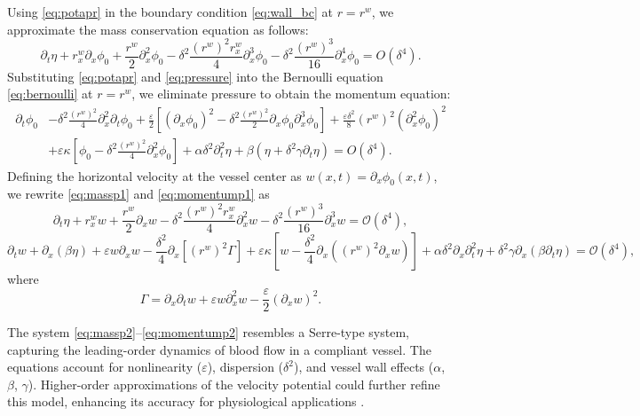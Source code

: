 \documentclass[alpha-refs, 12pt]{wiley-article}
\renewcommand{\O}{\mathcal{O}}
\newcommand{\eps}{\varepsilon}
\begin{document}
Using \eqref{eq:potapr} in the boundary condition \eqref{eq:wall_bc} at $r = r^w$, we approximate the mass conservation equation as follows:
\begin{equation}\label{eq:massp1}
  \partial_t \eta + r^w_x \partial_x \phi_0 + \frac{r^w}{2} \partial_x^2 \phi_0 - \delta^2 \frac{(r^w)^2 r^w_x}{4} \partial_x^3 \phi_0 - \delta^2 \frac{(r^w)^3}{16} \partial_x^4 \phi_0 = O(\delta^4).
\end{equation}
Substituting \eqref{eq:potapr} and \eqref{eq:pressure} into the Bernoulli equation \eqref{eq:bernoulli} at $r = r^w$, we eliminate pressure to obtain the momentum equation:
\begin{equation}\label{eq:momentump1}
\begin{split}
\partial_t \phi_0 & - \delta^2 \frac{(r^w)^2}{4} \partial_x^2 \partial_t \phi_0 + \frac{\eps}{2} \left[ (\partial_x \phi_0)^2 - \delta^2 \frac{(r^w)^2}{2} \partial_x \phi_0 \partial_x^3 \phi_0 \right] + \frac{\eps \delta^2}{8} (r^w)^2 (\partial_x^2 \phi_0)^2 \\
& + \eps \kappa \left[ \phi_0 - \delta^2 \frac{(r^w)^2}{4} \partial_x^2 \phi_0 \right] + \alpha \delta^2 \partial_t^2 \eta + \beta (\eta + \delta^2 \gamma \partial_t \eta) = O(\delta^4).
\end{split}
\end{equation}
Defining the horizontal velocity at the vessel center as $w(x, t) = \partial_x \phi_0(x, t)$, we rewrite \eqref{eq:massp1} and \eqref{eq:momentump1} as
\begin{equation}\label{eq:massp2}
  \partial_t \eta + r^w_x w + \frac{r^w}{2} \partial_x w - \delta^2 \frac{(r^w)^2 r^w_x}{4} \partial_x^2 w - \delta^2 \frac{(r^w)^3}{16} \partial_x^3 w = \O(\delta^4),
\end{equation}
\begin{equation}\label{eq:momentump2}
  \partial_t w + \partial_x (\beta \eta) + \eps w \partial_x w - \frac{\delta^2}{4} \partial_x \left[ (r^w)^2 \Gamma \right] + \eps \kappa \left[ w - \frac{\delta^2}{4} \partial_x \left( (r^w)^2 \partial_x w \right) \right] + \alpha \delta^2 \partial_x \partial_t^2 \eta + \delta^2 \gamma \partial_x (\beta \partial_t \eta) = \O(\delta^4),
\end{equation}
where
\begin{equation}\label{eq:gamma}
  \Gamma = \partial_x \partial_t w + \eps w \partial_x^2 w - \frac{\eps}{2} (\partial_x w)^2.
\end{equation}

The system \eqref{eq:massp2}--\eqref{eq:momentump2} resembles a Serre-type system, capturing the leading-order dynamics of blood flow in a compliant vessel. The equations account for nonlinearity ($\eps$), dispersion ($\delta^2$), and vessel wall effects ($\alpha$, $\beta$, $\gamma$). Higher-order approximations of the velocity potential could further refine this model, enhancing its accuracy for physiological applications \citep{Mitsotakis2019}.
\end{document}
